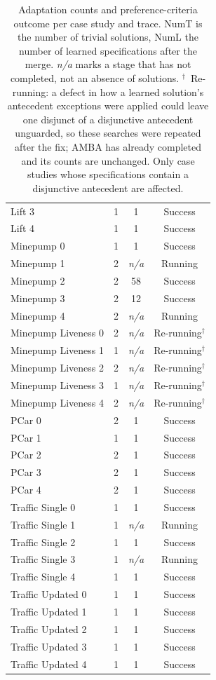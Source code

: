 \begin{table}[h]
\begin{tabular}{@{}lcc c@{}}
Lift 3 & 1 & 1 & Success \\
Lift 4 & 1 & 1 & Success \\
\midrule
Minepump 0 & 1 & 1 & Success \\
Minepump 1 & 2 & \textit{n/a} & Running \\
Minepump 2 & 2 & 58 & Success \\
Minepump 3 & 2 & 12 & Success \\
Minepump 4 & 2 & \textit{n/a} & Running \\
\midrule
Minepump Liveness 0 & 2 & \textit{n/a} & Re-running$^\dagger$ \\
Minepump Liveness 1 & 1 & \textit{n/a} & Re-running$^\dagger$ \\
Minepump Liveness 2 & 2 & \textit{n/a} & Re-running$^\dagger$ \\
Minepump Liveness 3 & 1 & \textit{n/a} & Re-running$^\dagger$ \\
Minepump Liveness 4 & 2 & \textit{n/a} & Re-running$^\dagger$ \\
\midrule
PCar 0 & 2 & 1 & Success \\
PCar 1 & 1 & 1 & Success \\
PCar 2 & 2 & 1 & Success \\
PCar 3 & 2 & 1 & Success \\
PCar 4 & 2 & 1 & Success \\
\midrule
Traffic Single 0 & 1 & 1 & Success \\
Traffic Single 1 & 1 & \textit{n/a} & Running \\
Traffic Single 2 & 1 & 1 & Success \\
Traffic Single 3 & 1 & \textit{n/a} & Running \\
Traffic Single 4 & 1 & 1 & Success \\
\midrule
Traffic Updated 0 & 1 & 1 & Success \\
Traffic Updated 1 & 1 & 1 & Success \\
Traffic Updated 2 & 1 & 1 & Success \\
Traffic Updated 3 & 1 & 1 & Success \\
Traffic Updated 4 & 1 & 1 & Success \\
\bottomrule
\end{tabular}
\caption{Adaptation counts and preference-criteria outcome per case study and trace. NumT is the number of trivial solutions, NumL the number of learned specifications after the merge. \textit{n/a} marks a stage that has not completed, not an absence of solutions. $^\dagger$~Re-running: a defect in how a learned solution's antecedent exceptions were applied could leave one disjunct of a disjunctive antecedent unguarded, so these searches were repeated after the fix; AMBA has already completed and its counts are unchanged. Only case studies whose specifications contain a disjunctive antecedent are affected.}
\label{tab:rq1}
\end{table}
